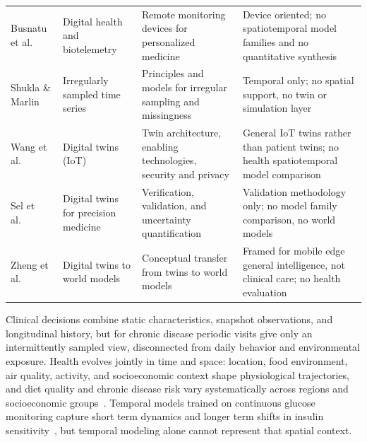 \documentclass[journal]{IEEEtran}
\newif\ifsubmission
\begin{document}
\begin{table}[t]
\begin{tabularx}{\textwidth}{>{\raggedright\arraybackslash}p{2.5cm} >{\raggedright\arraybackslash}p{2.6cm} >{\raggedright\arraybackslash}X >{\raggedright\arraybackslash}X}
\addlinespace[2pt]
\rowcolor{tablestripe}Busnatu et al.~\cite{Busnatu2022} & Digital health and biotelemetry & Remote monitoring devices for personalized medicine & Device oriented; no spatiotemporal model families and no quantitative synthesis \\
\addlinespace[2pt]
Shukla \& Marlin~\cite{shukla2021irregular} & Irregularly sampled time series & Principles and models for irregular sampling and missingness & Temporal only; no spatial support, no twin or simulation layer \\
\addlinespace[2pt]
\rowcolor{tablestripe}Wang et al.~\cite{Wang2023Survey} & Digital twins (IoT) & Twin architecture, enabling technologies, security and privacy & General IoT twins rather than patient twins; no health spatiotemporal model comparison \\
\addlinespace[2pt]
Sel et al.~\cite{Sel2025VVUQ} & Digital twins for precision medicine & Verification, validation, and uncertainty quantification & Validation methodology only; no model family comparison, no world models \\
\addlinespace[2pt]
\rowcolor{tablestripe}Zheng et al.~\cite{Zheng2026DTtoWM} & Digital twins to world models & Conceptual transfer from twins to world models & Framed for mobile edge general intelligence, not clinical care; no health evaluation \\
\bottomrule
\end{tabularx}
\fi
\end{table}

\ifsubmission
Clinical decisions combine static characteristics, snapshot observations, and longitudinal history, but for chronic disease periodic visits give only an intermittently sampled view, disconnected from daily behavior and environmental exposure. Health evolves jointly in time and space: location, food environment, air quality, activity, and socioeconomic context shape physiological trajectories, and diet quality and chronic disease risk vary systematically across regions and socioeconomic groups~\cite{McCullough2022Diet}. Temporal models trained on continuous glucose monitoring capture short term dynamics and longer term shifts in insulin sensitivity~\cite{Vaughan2025CGMPrediction}, but temporal modeling alone cannot represent that spatial context.
\end{document}

